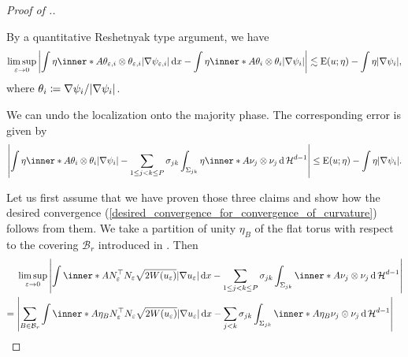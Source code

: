 \begin{proof}[Proof of .]
\begin{description}[wide=0pt]
		\item[Claim 2:]
		By a quantitative Reshetnyak type argument, we have
		\begin{equation*}
			\limsup_{ \varepsilon \to 0 }
			\abs{
				\int
				\eta \inner*{ A }{ \theta_{ \varepsilon, i } \otimes \theta_{ 
						\varepsilon,  i } }
				\abs{ \nabla \psi_{ \varepsilon,  i } }
				\dd{ x }
				-
				\int
				\eta \inner*{ A }{ \theta_{ i }  \otimes 
					\theta_{ i } }
				\abs{ \nabla \psi_{ i } }
			}
			\lesssim
			\energy ( u ; \eta ) - \int \eta \abs{ \nabla \psi_{ i } },
		\end{equation*}
		where $ \theta_{ i } \coloneqq \nabla \psi_{ i } / \abs{ \nabla \psi_{ 
				i } } $.
		\item[Claim 3:] 
		We can undo the localization onto the majority phase. The corresponding 
		error is given by
		\begin{equation*}
			\abs{ 
				\int
				\eta
				\inner*{ A }{ \theta_{ i } \otimes \theta_{ i } }
				\abs{ \nabla \psi_{ i } }
				-
				\sum_{ 1 \leq j < k \leq P }
				\sigma_{ j k }
				\int_{ \Sigma_{ j k } }
				\eta 
				\inner*{ A }{ \nu_{ j } \otimes \nu_{ j } }
				\dd{ \hm^{ d - 1 } }
			}
			\leq
			\energy ( u ; \eta ) - \int \eta \abs{ \nabla \psi_{ i } }.
		\end{equation*}
	\end{description}
	Let us first assume that we have proven those three claims and show how the 
	desired convergence 
	(\ref{desired_convergence_for_convergence_of_curvature}) follows from them. 
	We take a partition of unity $ \eta_{ B } $ of the flat torus with respect 
	to the covering $ \mathcal{ B }_{ r } $ introduced in 
	. Then
	\begin{align*}
		& \limsup_{ \varepsilon \to 0 }
		\abs{
			\int
			\inner*{ A }{ N_{ \varepsilon }^{ \top } N_{ \varepsilon } }
			\sqrt{ 2 W ( u_{ \varepsilon } ) }
			\abs{ \nabla u_{ \varepsilon } }
			\dd{ x }
			-
			\sum_{ 1 \leq j < k \leq P }
			\sigma_{ j  k }
			\int_{ \Sigma_{ j k } }
			\inner*{ A }{ \nu_{ j } \otimes \nu_{ j } }
			\dd{ \hm^{ d - 1 } }
		} 
		\\
		={} &
		\abs{ 
			\sum_{ B \in \mathcal{ B }_{ r } }
			\int
			\inner*{ A \eta_{ B } }
			{ N_{ \varepsilon }^{ \top } N_{ \varepsilon } }
			\sqrt{ 2 W ( u_{ \varepsilon } ) } \abs{ \nabla u_{ \varepsilon } }
			\dd{ x }
			-
			\sum_{ j < k }
			\sigma_{ j k }
			\int_{ \Sigma_{ j k } }
			\inner*{ A \eta_{ B } }
			{ \nu_{ j } \otimes \nu_{ j } }
			\dd{ \hm^{ d - 1 } }
		}
		\\

\end{align*}
\end{proof}
